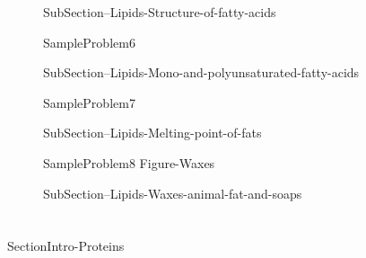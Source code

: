 \documentclass[main.tex]{subfiles}
\begin{document}
\sloppy\begin{description}

\item[] {SubSection--Lipids-Structure-of-fatty-acids}




  {SampleProblem6}




\item[] {SubSection--Lipids-Mono-and-polyunsaturated-fatty-acids}





  {SampleProblem7}



\item[]{SubSection--Lipids-Melting-point-of-fats}
 




  {SampleProblem8}
  {Figure-Waxes}

\item[] 
{SubSection--Lipids-Waxes-animal-fat-and-soaps}






\end{description}





\section{\color{blue!30!black}{Proteins}}
{SectionIntro-Proteins}
\end{document}
